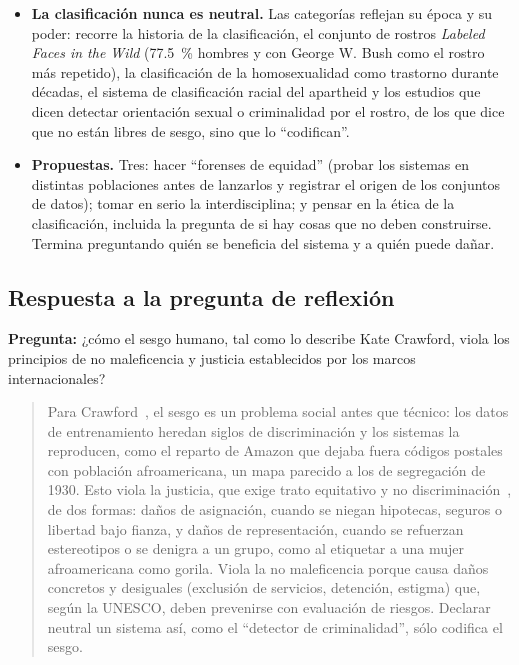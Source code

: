 \documentclass[11pt,letterpaper]{article}
\begin{document}
\begin{itemize}
    \item \textbf{La clasificación nunca es neutral.} Las categorías reflejan su época y su poder: recorre la historia de la clasificación, el conjunto de rostros \textit{Labeled Faces in the Wild} (77.5~\% hombres y con George W. Bush como el rostro más repetido), la clasificación de la homosexualidad como trastorno durante décadas, el sistema de clasificación racial del apartheid y los estudios que dicen detectar orientación sexual o criminalidad por el rostro, de los que dice que no están libres de sesgo, sino que lo ``codifican''.
    \item \textbf{Propuestas.} Tres: hacer ``forenses de equidad'' (probar los sistemas en distintas poblaciones antes de lanzarlos y registrar el origen de los conjuntos de datos); tomar en serio la interdisciplina; y pensar en la ética de la clasificación, incluida la pregunta de si hay cosas que no deben construirse. Termina preguntando quién se beneficia del sistema y a quién puede dañar.
\end{itemize}

\subsection{Respuesta a la pregunta de reflexión}

\textbf{Pregunta:} ¿cómo el sesgo humano, tal como lo describe Kate Crawford, viola los principios de no maleficencia y justicia establecidos por los marcos internacionales?

\begin{quote}
Para Crawford~\parencite{crawford2017}, el sesgo es un problema social antes que técnico: los datos de entrenamiento heredan siglos de discriminación y los sistemas la reproducen, como el reparto de Amazon que dejaba fuera códigos postales con población afroamericana, un mapa parecido a los de segregación de 1930. Esto viola la justicia, que exige trato equitativo y no discriminación~\parencite{unesco2021,oecd2019}, de dos formas: daños de asignación, cuando se niegan hipotecas, seguros o libertad bajo fianza, y daños de representación, cuando se refuerzan estereotipos o se denigra a un grupo, como al etiquetar a una mujer afroamericana como gorila. Viola la no maleficencia porque causa daños concretos y desiguales (exclusión de servicios, detención, estigma) que, según la UNESCO, deben prevenirse con evaluación de riesgos. Declarar neutral un sistema así, como el ``detector de criminalidad'', sólo codifica el sesgo.
\end{quote}
\end{document}
